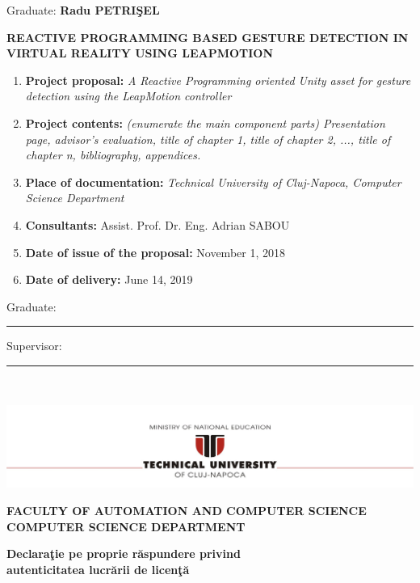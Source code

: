 \documentclass[12pt,a4paper,twoside]{report}
\renewcommand{\thesisauthor}{Radu PETRI\c{S}EL}    %
\renewcommand{\thesistitle}{REACTIVE PROGRAMMING BASED GESTURE DETECTION IN VIRTUAL REALITY USING LEAPMOTION}
\renewcommand{\thesissupervisor}{Assist. Prof. Dr. Eng. Adrian SABOU}
\newcommand{\department}{\bf FACULTY OF AUTOMATION AND COMPUTER SCIENCE\\
COMPUTER SCIENCE DEPARTMENT}
\newcommand{\utcnlogo}{\includegraphics[width=15cm]{img/tucn.jpg}}
\newcommand{\uline}[1]{\rule[0pt]{#1}{0.4pt}}
\begin{document}
\begin{center}
Graduate: {\bf \thesisauthor}

\vspace{1cm}

{\bf \thesistitle}
\end{center}

\vspace{1cm}

\begin{enumerate}
  \item {\bf Project proposal:} {\it A Reactive Programming oriented Unity asset for gesture detection using the LeapMotion controller}
  \item {\bf Project contents:} {\it (enumerate the main component parts) Presentation page, advisor's evaluation, title of chapter 1, title of chapter 2, ..., title of chapter n, bibliography, appendices.}
  \item {\bf Place of documentation:} {\it Technical University of Cluj-Napoca, Computer Science Department}
  \item {\bf Consultants:} \thesissupervisor{}
  \item {\bf Date of issue of the proposal:} November 1, 2018
  \item {\bf Date of  delivery:} June 14, 2019
\end{enumerate}

\vspace{1.2cm}

\hspace{6cm} Graduate: \uline{6cm} 

\vspace{0.5cm}
\hspace{6cm} Supervisor: \uline{6cm} 

\thispagestyle{empty}


\newpage
$ $


\thispagestyle{empty}
\newpage

\begin{center}
\utcnlogo

\department
\end{center}

\vspace{0.5cm}

\begin{center}
{\bf
Declara\c{t}ie pe proprie r\u{a}spundere privind\\ 
autenticitatea lucr\u{a}rii de licen\c{t}\u{a}}
\end{center}
\vspace{1cm}
\end{document}
